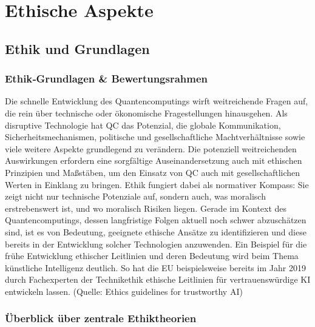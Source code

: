 \chapter{Ethische Aspekte}
\label{ethics} %



\section{Ethik und Grundlagen}
\subsection{Ethik‑Grundlagen \& Bewertungsrahmen}

Die schnelle Entwicklung des Quantencomputings wirft weitreichende Fragen auf, die rein über technische oder ökonomische Fragestellungen hinausgehen. Als disruptive Technologie hat QC das Potenzial, die globale Kommunikation, Sicherheitsmechanismen, politische und gesellschaftliche Machtverhältnisse sowie viele weitere Aspekte grundlegend zu verändern. Die potenziell weitreichenden Auswirkungen erfordern eine sorgfältige Auseinandersetzung auch mit ethischen Prinzipien und Maßstäben, um den Einsatz von QC auch mit gesellschaftlichen Werten in Einklang zu bringen. Ethik fungiert dabei als normativer Kompass: Sie zeigt nicht nur technische Potenziale auf, sondern auch, was moralisch erstrebenswert ist, und wo moralisch Risiken liegen. Gerade im Kontext des Quantencomputings, dessen langfristige Folgen aktuell noch schwer abzuschätzen sind, ist es von Bedeutung, geeignete ethische Ansätze zu identifizieren und diese bereits in der Entwicklung solcher Technologien anzuwenden. Ein Beispiel für die frühe Entwicklung ethischer Leitlinien und deren Bedeutung wird beim Thema künstliche Intelligenz deutlich. So hat die EU beispielsweise bereits im Jahr 2019 durch Fachexperten der Technikethik ethische Leitlinien für vertrauenswürdige KI entwickeln lassen. \cite{}
(Quelle: Ethics guidelines for trustworthy AI)

\subsection{Überblick über zentrale Ethiktheorien}

